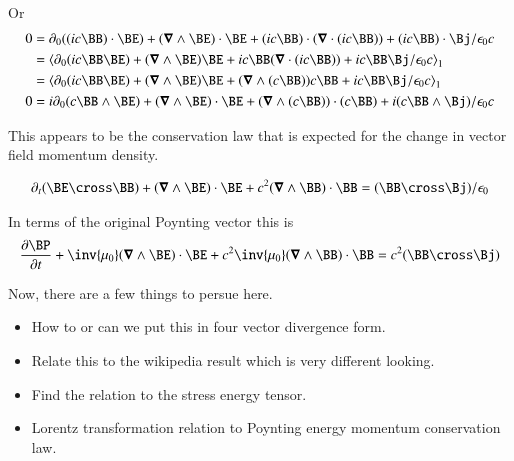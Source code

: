 \documentclass{article}
\begin{document}
Or
\begin{align*}
0
&= \partial_0 {((ic \BB) \cdot \BE)} +(\spacegrad \wedge \BE) \cdot \BE + (i c\BB) \cdot (\spacegrad \cdot (ic \BB)) + (i c\BB) \cdot \Bj/\epsilon_0 c \\
&= \gpgradeone{ \partial_0 (ic \BB \BE) +(\spacegrad \wedge \BE) \BE + i c\BB (\spacegrad \cdot (ic \BB)) + i c\BB \Bj/\epsilon_0 c } \\
&= \gpgradeone{ \partial_0 (ic \BB \BE) +(\spacegrad \wedge \BE) \BE + (\spacegrad \wedge (c \BB)) c \BB + i c\BB \Bj/\epsilon_0 c } \\
0 &= i\partial_0 (c \BB \wedge \BE) + (\spacegrad \wedge \BE) \cdot \BE + (\spacegrad \wedge (c \BB)) \cdot (c \BB) + i( c\BB \wedge \Bj)/\epsilon_0 c
\end{align*}

This appears to be the conservation law that is expected for the change in vector field momentum density.

\begin{align}\label{eqn:momCons}
\partial_t (\BE \cross \BB) + (\spacegrad \wedge \BE) \cdot \BE + c^2 (\spacegrad \wedge \BB) \cdot \BB = (\BB \cross \Bj)/\epsilon_0
\end{align}

In terms of the original Poynting vector this is
\begin{align}\label{eqn:withPoynting}
\PD{t}{\BP} + \inv{\mu_0}(\spacegrad \wedge \BE) \cdot \BE + c^2 \inv{\mu_0}(\spacegrad \wedge \BB) \cdot \BB = c^2 (\BB \cross \Bj)
\end{align}

%
%

Now, there are a few things to persue here.

\begin{itemize}
\item How to or can we put this in four vector divergence form.
\item Relate this to the wikipedia result which is very different looking.
\item Find the relation to the stress energy tensor.
\item Lorentz transformation relation to Poynting energy momentum conservation law.
\end{itemize}
\end{document}
